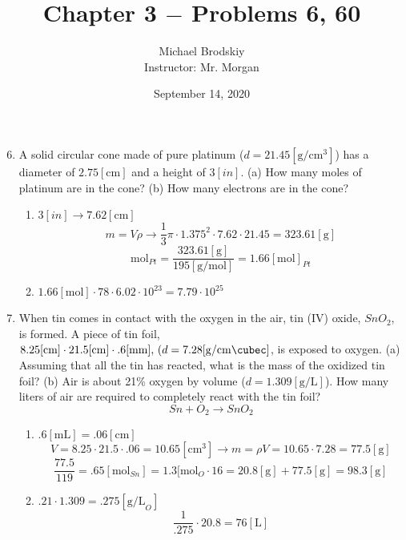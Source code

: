 \documentclass[12pt]{article}
\title{Chapter 3 $-$ Problems 6, 60}
\date{September 14, 2020}
\author{Michael Brodskiy\\ \small Instructor: Mr. Morgan}
\begin{document}
\maketitle

\begin{enumerate}

    \setcounter{enumi}{5}

  \item A solid circular cone made of pure platinum ($d=21.45[\si{\gram\per\centi\meter\cubed}]$) has a diameter of $2.75[\si{\centi\meter}]$ and a height of $3[in]$. (a) How many moles of platinum are in the cone? (b) How many electrons are in the cone?

    \begin{enumerate}

      \item $3[in]\rightarrow7.62[\si{\centi\meter}]$
        $$m=V\rho\rightarrow \frac{1}{3}\pi\cdot 1.375^2\cdot 7.62\cdot21.45=323.61[\si{\gram}]$$
        $$\si{\mol}_{Pt}=\frac{323.61[\si{\gram}]}{195[\si{\gram\per\mole}]}=1.66[\si{\mole}]_{Pt}$$

      \item $1.66[\si{\mole}]\cdot78\cdot6.02\cdot10^{23}=7.79\cdot10^25$

    \end{enumerate}
    \setcounter{enumi}{59}

  \item When tin comes in contact with the oxygen in the air, tin (IV) oxide, $SnO_2$, is formed. A piece of tin foil, $8.25[\si{\centi\meter}]\cdot21.5[\si{\centi\meter}]\cdot.6[\si{\milli\meter}],\, (d=7.28[\si{\gram\per\centi\meter\cubec}]$, is exposed to oxygen. (a) Assuming that all the tin has reacted, what is the mass of the oxidized tin foil? (b) Air is about 21\% oxygen by volume ($d=1.309[\si{\gram\per\liter}]$). How many liters of air are required to completely react with the tin foil?
    $$Sn+O_2\rightarrow SnO_2$$

    \begin{enumerate}

      \item $.6[\si{\milli\liter}]=.06[\si{\centi\meter}]$
        $$V=8.25\cdot21.5\cdot.06=10.65[\si{\centi\meter\cubed}]\rightarrow m=\rho V=10.65\cdot7.28=77.5[\si{\gram}]$$
        $$\frac{77.5}{119}=.65[\si{\mol}_{Sn}]=1.3[\si{\mol}_{O}\cdot 16=20.8[\si{\gram}] +77.5[\si{\gram}]=98.3[\si{\gram}]$$

        \item $.21\cdot1.309=.275[\si{\gram\per\liter}_O]$
          $$\frac{1}{.275}\cdot20.8=76[\si{\liter}]$$

    \end{enumerate}



\end{enumerate}
\end{document}
